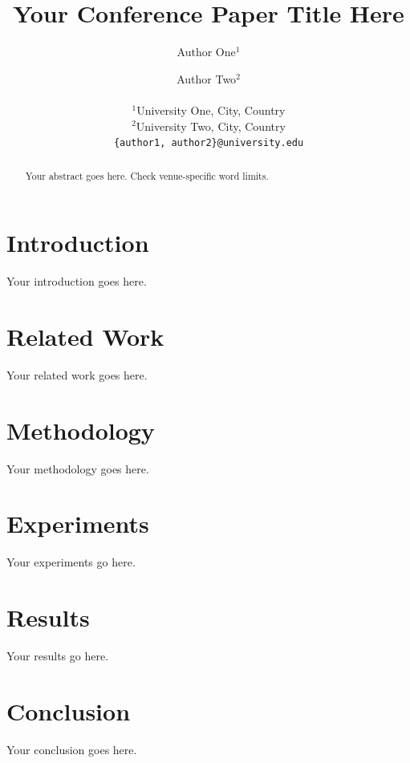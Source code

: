 \documentclass[10pt,twocolumn]{article}
\title{Your Conference Paper Title Here}
\author{
Author One$^1$ \and Author Two$^2$ \\
\\
$^1$University One, City, Country \\
$^2$University Two, City, Country \\
\texttt{\{author1, author2\}@university.edu}
}
\date{}
\begin{document}
\maketitle

\begin{abstract}
Your abstract goes here. Check venue-specific word limits.
\end{abstract}

\section{Introduction}
\label{sec:intro}

Your introduction goes here.

\section{Related Work}
\label{sec:related}

Your related work goes here.

\section{Methodology}
\label{sec:methodology}

Your methodology goes here.

\section{Experiments}
\label{sec:experiments}

Your experiments go here.

\section{Results}
\label{sec:results}

Your results go here.

\section{Conclusion}
\label{sec:conclusion}

Your conclusion goes here.



\end{document}
